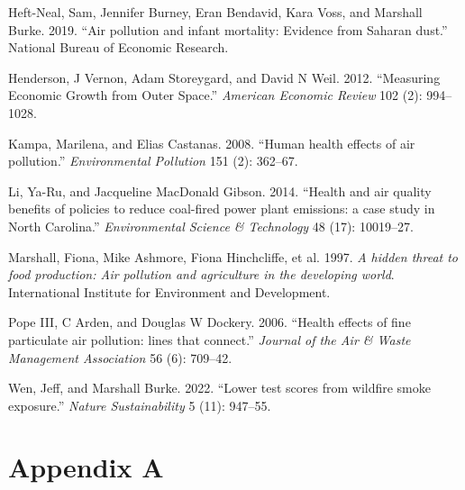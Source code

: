 \documentclass[
]{article}
\newlength{\cslhangindent}
\newlength{\cslentryspacingunit} %
\newenvironment{CSLReferences}[2] %
 {%
  \setlength{\parindent}{0pt}
  \ifodd #1
  \let\oldpar\par
  \def\par{\hangindent=\cslhangindent\oldpar}
  \fi
  \setlength{\parskip}{#2\cslentryspacingunit}
 }%
 {}
\begin{document}
\begin{CSLReferences}{1}{0}
\leavevmode{}%
Heft-Neal, Sam, Jennifer Burney, Eran Bendavid, Kara Voss, and Marshall Burke. 2019. {``{Air pollution and infant mortality: Evidence from Saharan dust}.''} {National Bureau of Economic Research}.

\leavevmode{}%
Henderson, J Vernon, Adam Storeygard, and David N Weil. 2012. {``Measuring Economic Growth from Outer Space.''} \emph{{American Economic Review}} 102 (2): 994--1028.

\leavevmode{}%
Kampa, Marilena, and Elias Castanas. 2008. {``{Human health effects of air pollution}.''} \emph{{Environmental Pollution}} 151 (2): 362--67.

\leavevmode{}%
Li, Ya-Ru, and Jacqueline MacDonald Gibson. 2014. {``{Health and air quality benefits of policies to reduce coal-fired power plant emissions: a case study in North Carolina}.''} \emph{{Environmental Science \& Technology}} 48 (17): 10019--27.

\leavevmode{}%
Marshall, Fiona, Mike Ashmore, Fiona Hinchcliffe, et al. 1997. \emph{{A hidden threat to food production: Air pollution and agriculture in the developing world}}. {International Institute for Environment and Development.}

\leavevmode{}%
Pope III, C Arden, and Douglas W Dockery. 2006. {``{Health effects of fine particulate air pollution: lines that connect}.''} \emph{{Journal of the Air \& Waste Management Association}} 56 (6): 709--42.

\leavevmode{}%
Wen, Jeff, and Marshall Burke. 2022. {``{Lower test scores from wildfire smoke exposure}.''} \emph{{Nature Sustainability}} 5 (11): 947--55.

\end{CSLReferences}

\FloatBarrier
\newpage

\hypertarget{appendix-a}{%
\section*{Appendix A}\label{appendix-a}}

\setcounter{table}{0} \renewcommand{\thetable}{A\arabic{table}} \setcounter{figure}{0} \renewcommand{\thefigure}{A\arabic{figure}} 
\FloatBarrier
\end{document}
